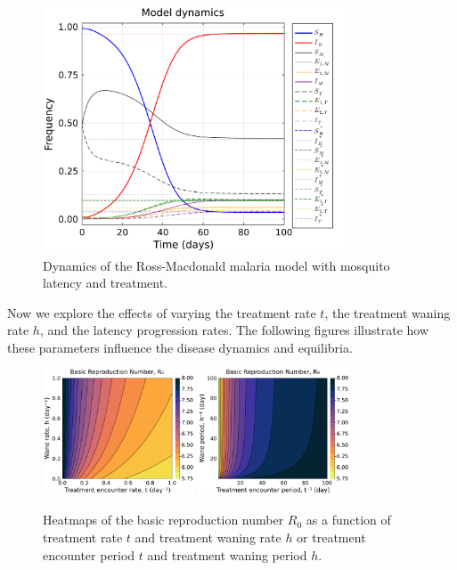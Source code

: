 \documentclass[11pt]{article}
\begin{document}
\begin{figure}[H]
  \centering
  \includegraphics[width=0.8\textwidth]{../../fig/model_dynamics.pdf}
  \caption{Dynamics of the Ross-Macdonald malaria model with mosquito latency and treatment.}
\end{figure}

Now we explore the effects of varying the treatment rate $t$, the treatment waning rate $h$, and the latency progression rates. The following figures illustrate how these parameters influence the disease dynamics and equilibria.

\begin{figure}[H]
  \centering
  \includegraphics[width=0.4\textwidth]{../../fig/brn_txh_heatmap.pdf}
  \includegraphics[width=0.4\textwidth]{../../fig/brn_txh_heatmap_rev.pdf}
  \caption{Heatmaps of the basic reproduction number $R_0$ as a function of treatment rate $t$ and treatment waning rate $h$ or treatment encounter period $t$ and treatment waning period $h$.}
\end{figure}
\end{document}
